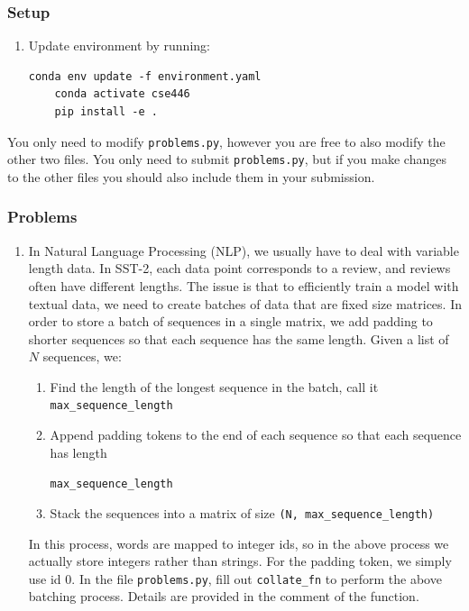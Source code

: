 \documentclass{article}
\begin{document}
\begin{bprob}
\subsubsection*{Setup}
\begin{enumerate}%
    \item Update environment by running:
    \begin{lstlisting}[basicstyle=\ttfamily\small]
    conda env update -f environment.yaml
    conda activate cse446
    pip install -e .
    \end{lstlisting}
\end{enumerate}
You only need to modify \texttt{problems.py}, however you are free to also modify the other two files. You only need to submit
\texttt{problems.py}, but if you make changes to the other files you should also include them in your submission.
\subsubsection*{Problems}
\begin{enumerate}
    \item {} In Natural Language Processing (NLP), we usually have to deal with variable length data. In SST-2, each data point corresponds
    to a review, and reviews often have different lengths. The issue is that to efficiently train a model with textual data, we need
    to create batches of data that are fixed size matrices. In order to store a batch of sequences in a single
    matrix, we add padding to shorter sequences so that each sequence has the same length. Given a list of $N$ sequences, we:
    \begin{enumerate}%
        \item Find the length of the longest sequence in the batch, call it \texttt{max\_sequence\_length}
        \item Append padding tokens to the end of each sequence so that each sequence has length

        \texttt{max\_sequence\_length}
        \item Stack the sequences into a matrix of size \texttt{(N, max\_sequence\_length)}
    \end{enumerate}
    In this process, words are mapped to integer ids, so in the above process we actually store integers rather than strings. For the padding token, we simply use
    id $0$. In the file \texttt{problems.py}, fill out \texttt{collate\_fn} to perform the above batching process. Details are provided in the comment of the function.
    

\end{enumerate}
\end{bprob}
\end{document}
